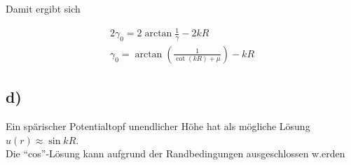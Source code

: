  Damit ergibt sich
 
 \begin{align}
 2 \gamma_0 = 2 \arctan{\frac{1}{\gamma} } - 2kR \\
 \gamma_0 = \arctan{\left( \frac{1}{\cot{\left(kR\right)} + \mu } \right) } - kR
 \end{align}
 
 \subsection{d)}
 
 Ein sp\"arischer Potentialtopf unendlicher H\"ohe hat als m\"ogliche L\"osung
 \\
 $u\left(r\right) \approx \sin{kR} $. \\
 Die ``cos''-L\"osung kann aufgrund der Randbedingungen ausgeschlossen w.erden
 
 